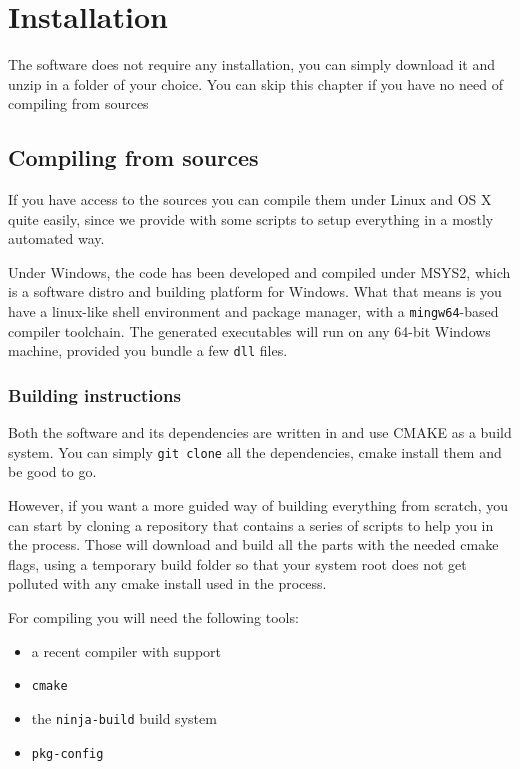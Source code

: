 \chapter{Installation}
The software does not require any installation, you can simply download it
and unzip in a folder of your choice. 
You can skip this chapter if you have no need of compiling from sources

\section{Compiling from sources}

If you have access to the sources you can compile them under Linux and OS X
quite easily, since we provide with some scripts to setup everything
in a mostly automated way.

Under Windows, the code has been developed and compiled under MSYS2, which
is a software distro and building platform for Windows. What that means is
you have a linux-like shell environment and package manager, with a
\texttt{mingw64}-based compiler toolchain. The generated executables will run
on any 64-bit Windows machine, provided you bundle a few \texttt{dll} files.

\subsection{Building instructions}
Both the software and its dependencies are written in \CC{} and use CMAKE as a
build system. You can simply \texttt{git clone} all the dependencies, cmake install
them and be good to go.

However, if you want a more guided way of building everything from scratch,
you can start by cloning a repository that contains a series of scripts to help
you in the process. Those will download and build
all the parts with the needed cmake flags, using a temporary build folder
so that your system root does not get polluted with any cmake install used
in the process.

For compiling you will need the following tools:
\begin{itemize}
    \item a recent compiler with  support
    \item \texttt{cmake}
    \item the \texttt{ninja-build} build system
    \item \texttt{pkg-config}
\end{itemize}

